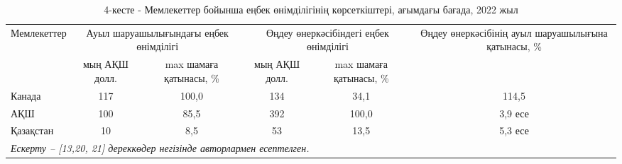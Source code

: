\begin{table}[H]
\caption*{4-кесте - Мемлекеттер бойынша еңбек өнімділігінің көрсеткіштері, ағымдағы бағада, 2022 жыл}
\centering
\begin{tabular}{|lccccc|}
\hline
\multicolumn{1}{|l|}{\multirow{2}{*}{Мемлекеттер}} &
  \multicolumn{2}{p{0.2\textwidth}|}{Ауыл шаруашылығындағы еңбек өнімділігі} &
  \multicolumn{2}{p{0.2\textwidth}|}{Өңдеу өнеркәсібіндегі еңбек өнімділігі} &
  \multicolumn{1}{p{0.2\textwidth}|}{\multirow{2}{=}{Өңдеу өнеркәсібінің ауыл шаруашылығына қатынасы, \%}} \\ \cline{2-5}
\multicolumn{1}{|l|}{} &
  \multicolumn{1}{p{0.1\textwidth}|}{мың АҚШ долл.} &
  \multicolumn{1}{p{0.1\textwidth}|}{max шамаға қатынасы, \%} &
  \multicolumn{1}{p{0.1\textwidth}|}{мың АҚШ долл.} &
  \multicolumn{1}{p{0.1\textwidth}|}{max шамаға қатынасы, \%} &
  \multicolumn{1}{l|}{} \\ \hline
\multicolumn{1}{|l|}{Канада}    & \multicolumn{1}{c|}{117} & \multicolumn{1}{c|}{100,0} & \multicolumn{1}{c|}{134} & \multicolumn{1}{c|}{34,1}  & 114,5   \\ \hline
\multicolumn{1}{|l|}{АҚШ}       & \multicolumn{1}{c|}{100} & \multicolumn{1}{c|}{85,5}  & \multicolumn{1}{c|}{392} & \multicolumn{1}{c|}{100,0} & 3,9 есе \\ \hline
\multicolumn{1}{|l|}{Қазақстан} & \multicolumn{1}{c|}{10}  & \multicolumn{1}{c|}{8,5}   & \multicolumn{1}{c|}{53}  & \multicolumn{1}{c|}{13,5}  & 5,3 есе \\ \hline
\multicolumn{6}{|l|}{\textit{Ескерту – {[}13,20, 21{]} дереккөдер негізінде авторлармен есептелген.}}                                                     \\ \hline
\end{tabular}%
\end{table}

